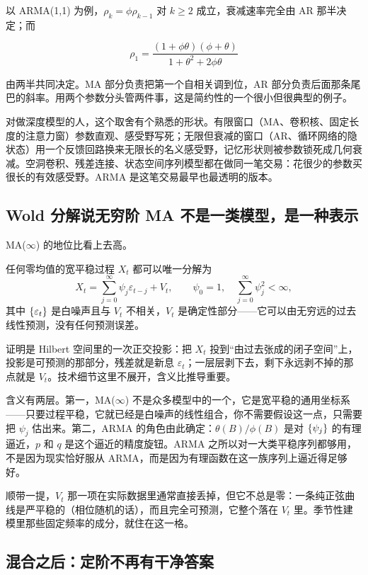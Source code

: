 以 ARMA(1,1) 为例，\(\rho_k=\phi\rho_{k-1}\) 对 \(k\ge2\) 成立，衰减速率完全由 AR 那半决定；而

\[
\rho_1=\frac{(1+\phi\theta)(\phi+\theta)}{1+\theta^2+2\phi\theta}
\]

由两半共同决定。MA 部分负责把第一个自相关调到位，AR 部分负责后面那条尾巴的斜率。用两个参数分头管两件事，这是简约性的一个很小但很典型的例子。

对做深度模型的人，这个取舍有个熟悉的形状。有限窗口（MA、卷积核、固定长度的注意力窗）参数直观、感受野写死；无限但衰减的窗口（AR、循环网络的隐状态）用一个反馈回路换来无限长的名义感受野，记忆形状则被参数锁死成几何衰减。空洞卷积、残差连接、状态空间序列模型都在做同一笔交易：花很少的参数买很长的有效感受野。ARMA 是这笔交易最早也最透明的版本。

\subsection{Wold 分解说无穷阶 MA 不是一类模型，是一种表示}

MA(\(\infty\)) 的地位比看上去高。

\begin{theorem}[Wold 分解]
任何零均值的宽平稳过程 \(X_t\) 都可以唯一分解为
\[
X_t=\sum_{j=0}^{\infty}\psi_j\varepsilon_{t-j}+V_t,
\qquad \psi_0=1,\quad \sum_{j=0}^{\infty}\psi_j^2<\infty,
\]
其中 \(\left\{\varepsilon_t\right\}\) 是白噪声且与 \(V_t\) 不相关，\(V_t\) 是确定性部分——它可以由无穷远的过去线性预测，没有任何预测误差。
\end{theorem}

证明是 Hilbert 空间里的一次正交投影：把 \(X_t\) 投到``由过去张成的闭子空间''上，投影是可预测的那部分，残差就是新息 \(\varepsilon_t\)；一层层剥下去，剩下永远剥不掉的那点就是 \(V_t\)。技术细节这里不展开，含义比推导重要。

含义有两层。第一，MA(\(\infty\)) 不是众多模型中的一个，它是宽平稳的通用坐标系——只要过程平稳，它就已经是白噪声的线性组合，你不需要假设这一点，只需要把 \(\psi_j\) 估出来。第二，ARMA 的角色由此确定：\(\theta(B)/\phi(B)\) 是对 \(\left\{\psi_j\right\}\) 的有理逼近，\(p\) 和 \(q\) 是这个逼近的精度旋钮。ARMA 之所以对一大类平稳序列都够用，不是因为现实恰好服从 ARMA，而是因为有理函数在这一族序列上逼近得足够好。

顺带一提，\(V_t\) 那一项在实际数据里通常直接丢掉，但它不总是零：一条纯正弦曲线是严平稳的（相位随机的话），而且完全可预测，它整个落在 \(V_t\) 里。季节性建模里那些固定频率的成分，就住在这一格。

\subsection{混合之后：定阶不再有干净答案}

